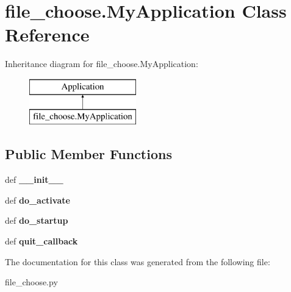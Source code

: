 \hypertarget{classfile__choose_1_1MyApplication}{\section{file\-\_\-choose.\-My\-Application Class Reference}
\label{classfile__choose_1_1MyApplication}
}
Inheritance diagram for file\-\_\-choose.\-My\-Application\-:\begin{figure}[H]
\begin{center}
\leavevmode
\includegraphics[height=2.000000cm]{classfile__choose_1_1MyApplication}
\end{center}
\end{figure}
\subsection*{Public Member Functions}
\begin{DoxyCompactItemize}
\item 
\hypertarget{classfile__choose_1_1MyApplication_aa1454342071efcf0514db7f37dbaca4c}{def {\bfseries \-\_\-\-\_\-init\-\_\-\-\_\-}}\label{classfile__choose_1_1MyApplication_aa1454342071efcf0514db7f37dbaca4c}

\item 
\hypertarget{classfile__choose_1_1MyApplication_a955822b8556a9761aa5cd323799a6a47}{def {\bfseries do\-\_\-activate}}\label{classfile__choose_1_1MyApplication_a955822b8556a9761aa5cd323799a6a47}

\item 
\hypertarget{classfile__choose_1_1MyApplication_ac8ed302ac37a994768275af90ea2df40}{def {\bfseries do\-\_\-startup}}\label{classfile__choose_1_1MyApplication_ac8ed302ac37a994768275af90ea2df40}

\item 
\hypertarget{classfile__choose_1_1MyApplication_a8548026209c002cefcdaf0090596ab5d}{def {\bfseries quit\-\_\-callback}}\label{classfile__choose_1_1MyApplication_a8548026209c002cefcdaf0090596ab5d}

\end{DoxyCompactItemize}


The documentation for this class was generated from the following file\-:\begin{DoxyCompactItemize}
\item 
file\-\_\-choose.\-py\end{DoxyCompactItemize}
